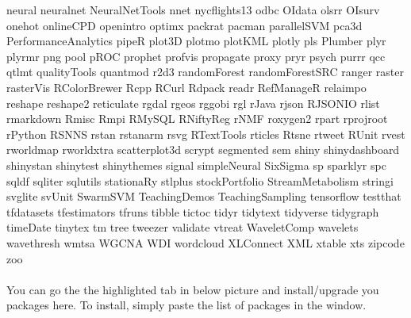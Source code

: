 \documentclass[11pt]{article} %
\begin{document}
\begin{itemize}
          neural 
          neuralnet 
          NeuralNetTools
          nnet
          nycflights13
          odbc
          OIdata  
          olsrr
          OIsurv 
          onehot
          onlineCPD
          openintro 
          optimx
          packrat 
          pacman
          parallelSVM
          pca3d    
          PerformanceAnalytics
          pipeR 
          plot3D 
          plotmo
          plotKML
          plotly
          pls
          Plumber
          plyr
          plyrmr
          png
          pool
          pROC
          prophet
          profvis
          propagate
          proxy
          pryr
          psych  
          purrr
          qcc 
          qtlmt
          qualityTools   
          quantmod 
          r2d3
          randomForest
          randomForestSRC
          ranger
          raster
          rasterVis
          RColorBrewer 
          Rcpp 
          RCurl
          Rdpack
          readr
          RefManageR
          relaimpo
          reshape 
          reshape2 
          reticulate
          rgdal
          rgeos 
          rggobi 
          rgl 
          rJava 
          rjson
          RJSONIO 
          rlist 
          rmarkdown 
          Rmisc
          Rmpi
          RMySQL 
          RNiftyReg   
          rNMF 
          roxygen2 
          rpart 
          rprojroot
          rPython 
          RSNNS
          rstan
          rstanarm
          rsvg
          RTextTools
          rticles
          Rtsne
          rtweet
          RUnit
          rvest   
          rworldmap
          rworldxtra
          scatterplot3d  
          scrypt 
          segmented 
          sem 
          shiny
          shinydashboard
          shinystan
          shinytest
          shinythemes
          signal
          simpleNeural
          SixSigma  
          sp 
          sparklyr
          spc 
          sqldf  
          sqliter
          sqlutils 
          stationaRy 
          stlplus
          stockPortfolio 
          StreamMetabolism
          stringi
          svglite
          svUnit
          SwarmSVM
          TeachingDemos 
          TeachingSampling
          tensorflow
          testthat
          tfdatasets
          tfestimators
          tfruns 
          tibble
          tictoc
          tidyr 
          tidytext
          tidyverse
          tidygraph
          timeDate
          tinytex
          tm
          tree 
          tweezer
          validate
          vtreat
          WaveletComp
          wavelets
          wavethresh
          wmtsa
          WGCNA
          WDI 
          wordcloud 
          XLConnect  
          XML 
          xtable
          xts 
          zipcode
          zoo 
        \\
        \\
        You can go the the highlighted tab in below picture and install/upgrade you packages here. 
        To install, simply paste the list of packages in the window. 
        

\end{itemize}
\end{document}
